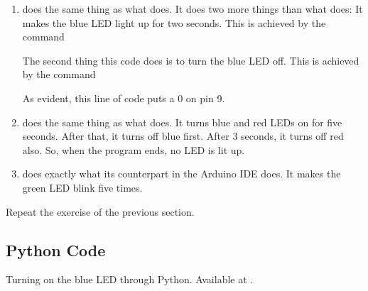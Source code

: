 \begin{enumerate}
  \item {} does the same thing as what  does. 
        It does two more things than what  does: It makes the blue LED light up for two
        seconds.  This is achieved by the command
        
        The second thing this code does is to turn the blue LED off.  This
        is achieved by the command
        
        As evident, this line of code puts a 0 on pin 9.
  \item {} does the same thing as what  does. 
         It turns blue and red LEDs on for five seconds.  After that, it turns off blue 
         first.  After 3 seconds, it turns off red also.  So, when the program ends, 
         no LED is lit up.
  
  \item {} does exactly what its counterpart in the Arduino IDE does.  
        It makes the green LED blink five times.
\end{enumerate}

\begin{exercise}
  Repeat the exercise of the previous section.
\end{exercise}

\subsection{Python Code}
\lstset{style=mystyle}
\label{sec:led-python-code}

\begin{pycode}
  {Turning on the blue LED through Python. Available at
    .}
  \label{py:led-blue}
  
\end{pycode}

\begin{pycode}
  \label{py:led-blue-delay}
  
\end{pycode}

